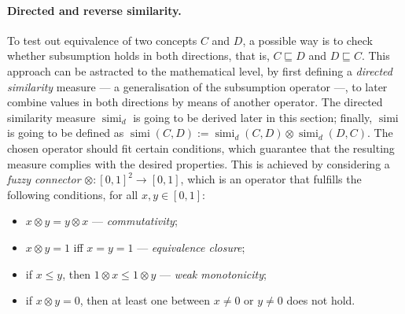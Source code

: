 \documentclass[]{llncs}
\DeclareMathOperator{\simi}{simi}
\theoremstyle{remark}
\begin{document}
  \paragraph{Directed and reverse similarity.}
  To test out equivalence of two concepts \(C\) and \(D\), a possible way is to check whether subsumption holds in both directions, that is, \(C \sqsubseteq D\) and \(D \sqsubseteq C\).
  This approach can be astracted to the mathematical level, by first defining a \emph{directed similarity} measure --- a generalisation of the subsumption operator ---, to later combine values in both directions by means of another operator.
  The directed similarity measure \(\simi_d\) is going to be derived later in this section; finally, \(\simi\) is going to be defined as \(\simi(C,D) := \simi_d(C,D) \otimes \simi_d(D,C)\).
  The chosen operator should fit certain conditions, which guarantee that the resulting measure complies with the desired properties.
  This is achieved by considering a \emph{fuzzy connector} \(\otimes \colon {[0,1]}^2 \to [0,1]\), which is an operator that fulfills the following conditions, for all \(x, y \in [0,1]\):
  \begin{itemize}
    \item \(x \otimes y = y \otimes x\) --- \emph{commutativity};
    \item \(x \otimes y = 1\) iff \(x = y = 1\) --- \emph{equivalence closure};
    \item if \(x \le y\), then \(1 \otimes x \le 1 \otimes y\) --- \emph{weak monotonicity};
    \item if \(x \otimes y = 0\), then at least one between \(x \ne 0\) or \(y \ne 0\) does not hold.
  \end{itemize}
\end{document}
